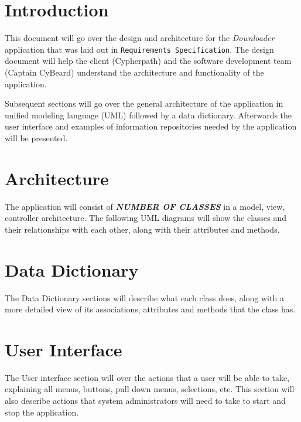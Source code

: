 \documentclass{article}
\title{}
\author{}
\date{}
\begin{document}



\tableofcontents
\newpage
\listoffigures
\newpage

\begin{versionhistory}
\end{versionhistory}
\newpage

\section{Introduction}
This document will go over the design and architecture for the \textit{Downloader} application that was laid out in
\texttt{Requirements Specification}\cite{reqs}. The design document will help the client (Cypherpath) and the
software development team (Captain CyBeard) understand the architecture and functionality of the application.

Subsequent sections will go over the general architecture of the application in unified modeling language
(UML) followed by a data dictionary. Afterwards the user interface and examples of information repositories needed
by the application will be presented.

\section{Architecture}
The application will consist of \textbf{\textit{NUMBER OF CLASSES}} in a model, view, controller architecture. The following
UML diagrams will show the classes and their relationships with each other, along with their attributes and methods.


\section{Data Dictionary}
The Data Dictionary sections will describe what each class does, along with a more detailed view of its
associations, attributes and methods that the class has.

%
%
%
%
%
%

\section{User Interface}
The User interface section will over the actions that a user will be able to take, explaining all menus, buttons,
pull down menus, selections, etc. This section will also describe actions that system administrators will need to
take to start and stop the application.
\end{document}
